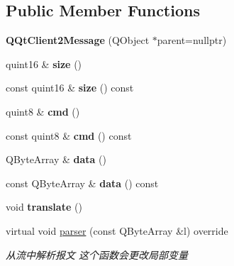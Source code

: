 \subsection*{Public Member Functions}
\begin{DoxyCompactItemize}
\item 
\mbox{\label{class_q_qt_client2_message_adf070c6293b46521676c49bb739a84cc}} 
{\bfseries Q\+Qt\+Client2\+Message} (Q\+Object $\ast$parent=nullptr)
\item 
\mbox{\label{class_q_qt_client2_message_a97aab72f39c8ef7dd769c6288ae10560}} 
quint16 \& {\bfseries size} ()
\item 
\mbox{\label{class_q_qt_client2_message_a35e7cb82ed8f229c3e6feebba5d090f6}} 
const quint16 \& {\bfseries size} () const
\item 
\mbox{\label{class_q_qt_client2_message_a76c6980d32449dd5fa533b3cb8795be2}} 
quint8 \& {\bfseries cmd} ()
\item 
\mbox{\label{class_q_qt_client2_message_aaa7d3593e47bf5c2dc73ee2191b2dae1}} 
const quint8 \& {\bfseries cmd} () const
\item 
\mbox{\label{class_q_qt_client2_message_aba747c8696410cf6bea566bb3ad06c8c}} 
Q\+Byte\+Array \& {\bfseries data} ()
\item 
\mbox{\label{class_q_qt_client2_message_ab72e6dd3162159c91865917146c8f179}} 
const Q\+Byte\+Array \& {\bfseries data} () const
\item 
\mbox{\label{class_q_qt_client2_message_a95af1f1a9fa69a3bbabc0b8228d1b1f1}} 
void {\bfseries translate} ()
\item 
virtual void \mbox{\hyperlink{class_q_qt_client2_message_a62ecd0dc6ff91e806dcbfbe48ca39ac8}{parser}} (const Q\+Byte\+Array \&l) override
\begin{DoxyCompactList}\small\item\em 从流中解析报文 这个函数会更改局部变量 \end{DoxyCompactList}\item 

\end{DoxyCompactItemize}
